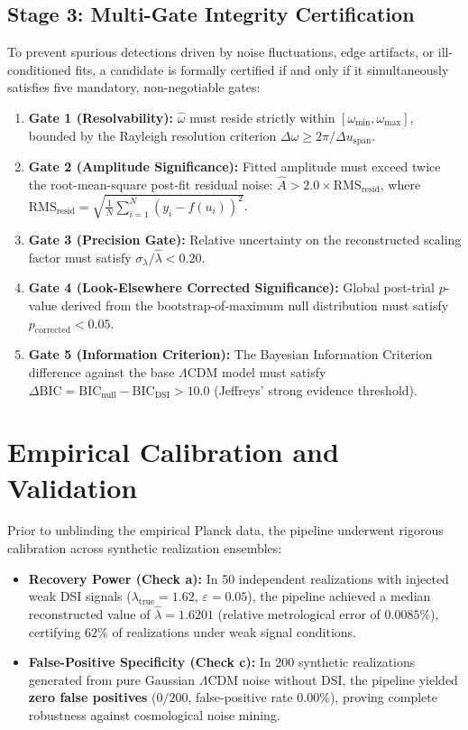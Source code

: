 \subsection{Stage 3: Multi-Gate Integrity Certification}
To prevent spurious detections driven by noise fluctuations, edge artifacts, or ill-conditioned fits, a candidate is formally certified if and only if it simultaneously satisfies five mandatory, non-negotiable gates:
\begin{enumerate}
    \item \textbf{Gate 1 (Resolvability):} $\hat\omega$ must reside strictly within $[\omega_{\min}, \omega_{\max}]$, bounded by the Rayleigh resolution criterion $\Delta\omega \ge 2\pi / \Delta u_{\mathrm{span}}$.
    \item \textbf{Gate 2 (Amplitude Significance):} Fitted amplitude must exceed twice the root-mean-square post-fit residual noise: $\hat A > 2.0 \times \mathrm{RMS}_{\mathrm{resid}}$, where $\mathrm{RMS}_{\mathrm{resid}} = \sqrt{\frac{1}{N}\sum_{i=1}^N (y_i - f(u_i))^2}$.
    \item \textbf{Gate 3 (Precision Gate):} Relative uncertainty on the reconstructed scaling factor must satisfy $\sigma_\lambda / \hat\lambda < 0.20$.
    \item \textbf{Gate 4 (Look-Elsewhere Corrected Significance):} Global post-trial $p$-value derived from the bootstrap-of-maximum null distribution must satisfy $p_{\mathrm{corrected}} < 0.05$.
    \item \textbf{Gate 5 (Information Criterion):} The Bayesian Information Criterion difference against the base $\Lambda$CDM model must satisfy $\Delta\mathrm{BIC} = \mathrm{BIC}_{\mathrm{null}} - \mathrm{BIC}_{\mathrm{DSI}} > 10.0$ (Jeffreys' strong evidence threshold).
\end{enumerate}

\section{Empirical Calibration and Validation}
Prior to unblinding the empirical Planck data, the pipeline underwent rigorous calibration across synthetic realization ensembles:
\begin{itemize}
    \item \textbf{Recovery Power (Check a):} In 50 independent realizations with injected weak DSI signals ($\lambda_{\mathrm{true}} = 1.62$, $\varepsilon = 0.05$), the pipeline achieved a median reconstructed value of $\hat\lambda = 1.6201$ (relative metrological error of $0.0085\%$), certifying $62\%$ of realizations under weak signal conditions.
    \item \textbf{False-Positive Specificity (Check c):} In 200 synthetic realizations generated from pure Gaussian $\Lambda$CDM noise without DSI, the pipeline yielded \textbf{zero false positives} ($0/200$, false-positive rate $0.00\%$), proving complete robustness against cosmological noise mining.
\end{itemize}


